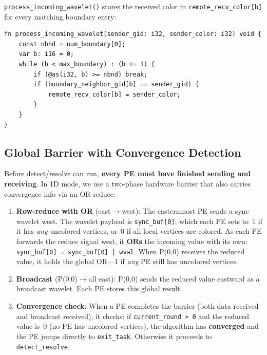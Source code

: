 \documentclass[11pt,letterpaper]{article}
\begin{document}
\texttt{process\_incoming\_wavelet()} stores the received color in \texttt{remote\_recv\_color[b]} for every matching boundary entry:

\begin{lstlisting}[language=CSL, numbers=none]
fn process_incoming_wavelet(sender_gid: i32, sender_color: i32) void {
    const nbnd = num_boundary[0];
    var b: i16 = 0;
    while (b < max_boundary) : (b += 1) {
        if (@as(i32, b) >= nbnd) break;
        if (boundary_neighbor_gid[b] == sender_gid) {
            remote_recv_color[b] = sender_color;
        }
    }
}
\end{lstlisting}

\subsection{Global Barrier with Convergence Detection}
\label{sec:convergence}

Before detect/resolve can run, \textbf{every PE must have finished sending and receiving}. In 1D mode, we use a two-phase hardware barrier that also carries convergence info via an OR-reduce:

\begin{enumerate}[nosep]
  \item \textbf{Row-reduce with OR} (east$\to$west): The easternmost PE sends a sync wavelet west. The wavelet payload is \texttt{sync\_buf[0]}, which each PE sets to~1 if it has \emph{any} uncolored vertices, or~0 if all local vertices are colored. As each PE forwards the reduce signal west, it \textbf{ORs} the incoming value with its own: \texttt{sync\_buf[0] = sync\_buf[0] | wval}. When P(0,0) receives the reduced value, it holds the global OR---1 if \emph{any} PE still has uncolored vertices.
  \item \textbf{Broadcast} (P(0,0)$\to$all east): P(0,0) sends the reduced value eastward as a broadcast wavelet. Each PE stores this global result.
  \item \textbf{Convergence check}: When a PE completes the barrier (both data received and broadcast received), it checks: if \texttt{current\_round > 0} and the reduced value is~0 (no PE has uncolored vertices), the algorithm has \textbf{converged} and the PE jumps directly to \texttt{exit\_task}. Otherwise it proceeds to \texttt{detect\_resolve}.
\end{enumerate}
\end{document}
